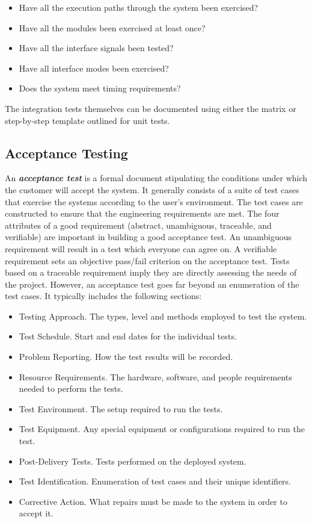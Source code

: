 {\begin{itemize}
\item
  Have all the execution paths through the system been exercised?
\item
  Have all the modules been exercised at least once?
\item
  Have all the interface signals been tested?
\item
  Have all interface modes been exercised?
\item
  Does the system meet timing requirements?
\end{itemize}

The integration tests themselves can be documented using either the
matrix or step-by-step template outlined for unit tests.

\subsection{Acceptance Testing}
\label{subsection:acceptance-testing}

An \emph{\textbf{acceptance test}} is a formal document stipulating the
conditions under which the customer will accept the system. It generally
consists of a suite of test cases that exercise the systems according to
the user's environment. The test cases are constructed to ensure that
the engineering requirements are met. The four attributes of a good
requirement (abstract, unambiguous, traceable, and verifiable) are
important in building a good acceptance test. An unambiguous requirement
will result in a test which everyone can agree on. A verifiable
requirement sets an objective pass/fail criterion on the acceptance
test. Tests based on a traceable requirement imply they are directly
assessing the needs of the project. However, an acceptance test goes far
beyond an enumeration of the test cases. It typically includes the
following sections:

\begin{itemize}
\item
  Testing Approach. The types, level and methods employed to test the
  system.
\item
  Test Schedule. Start and end dates for the individual tests.
\item
  Problem Reporting. How the test results will be recorded.
\item
  Resource Requirements. The hardware, software, and people requirements
  needed to perform the tests.
\item
  Test Environment. The setup required to run the tests.
\item
  Test Equipment. Any special equipment or configurations required to
  run the test.
\item
  Post-Delivery Tests. Tests performed on the deployed system.
\item
  Test Identification. Enumeration of test cases and their unique
  identifiers.
\item
  Corrective Action. What repairs must be made to the system in order to
  accept it.
\end{itemize}

}
